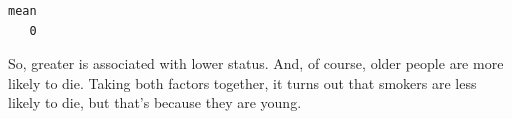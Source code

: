 \begin{example}
\begin{knitrout}
{\begin{kframe}
\begin{flushleft}
\hlstd{}\hlkeyword{(}\hlkeyword{,}{\ }\hlkeyword{(}\hlkeyword{(}\hlkeyword{)}{\ }\hlkeyword{\usebox{\hlnormalsizeboxgreaterthan}}{\ }\hlkeyword{(}\hlkeyword{-}\hlkeyword{)}\hlkeyword{)}\hlkeyword{)}{\ }{\ }\mbox{}
\normalfont
\end{flushleft}
\begin{verbatim}
mean 
   0 
\end{verbatim}
\end{kframe}}
\end{knitrout}

So, greater  is associated with lower  status.
And, of course, older people  are more likely to die.  Taking both factors
together, it turns out that smokers are less likely to die, but that's because
they are young.  
\end{example}

